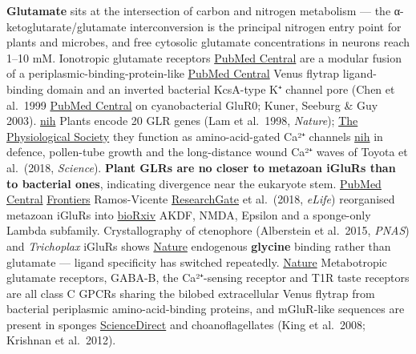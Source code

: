 \textbf{Glutamate} sits at the intersection of carbon and nitrogen metabolism --- the α-ketoglutarate/glutamate interconversion is the principal nitrogen entry point for plants and microbes, and free cytosolic glutamate concentrations in neurons reach 1--10 mM. Ionotropic glutamate receptors \href{https://pmc.ncbi.nlm.nih.gov/articles/PMC9233959/}{PubMed Central} are a modular fusion of a periplasmic-binding-protein-like \href{https://pmc.ncbi.nlm.nih.gov/articles/PMC9233959/}{PubMed Central} Venus flytrap ligand-binding domain and an inverted bacterial KcsA-type K⁺ channel pore (Chen et al.~1999 \href{https://pmc.ncbi.nlm.nih.gov/articles/PMC9233959/}{PubMed Central} on cyanobacterial GluR0; Kuner, Seeburg \& Guy 2003). \href{https://www.ncbi.nlm.nih.gov/pmc/articles/PMC2924276/}{nih} Plants encode 20 GLR genes (Lam et al.~1998, \emph{Nature}); \href{https://physoc.onlinelibrary.wiley.com/doi/10.1113/JP279026}{The Physiological Society} they function as amino-acid-gated Ca²⁺ channels \href{https://www.ncbi.nlm.nih.gov/pmc/articles/PMC2924276/}{nih} in defence, pollen-tube growth and the long-distance wound Ca²⁺ waves of Toyota et al.~(2018, \emph{Science}). \textbf{Plant GLRs are no closer to metazoan iGluRs than to bacterial ones}, indicating divergence near the eukaryote stem. \href{https://pmc.ncbi.nlm.nih.gov/articles/PMC3483616/}{PubMed Central} \href{https://www.frontiersin.org/articles/10.3389/fpls.2012.00235/full}{Frontiers} Ramos-Vicente \href{https://www.researchgate.net/scientific-contributions/David-Ramos-Vicente-2129164358}{ResearchGate} et al.~(2018, \emph{eLife}) reorganised metazoan iGluRs into \href{https://www.biorxiv.org/content/10.1101/2024.06.25.600656v1.full}{bioRxiv} AKDF, NMDA, Epsilon and a sponge-only Lambda subfamily. Crystallography of ctenophore (Alberstein et al.~2015, \emph{PNAS}) and \emph{Trichoplax} iGluRs shows \href{https://www.nature.com/articles/s42003-025-08402-3}{Nature} endogenous \textbf{glycine} binding rather than glutamate --- ligand specificity has switched repeatedly. \href{https://www.nature.com/articles/s42003-025-08402-3}{Nature} Metabotropic glutamate receptors, GABA-B, the Ca²⁺-sensing receptor and T1R taste receptors are all class C GPCRs sharing the bilobed extracellular Venus flytrap from bacterial periplasmic amino-acid-binding proteins, and mGluR-like sequences are present in sponges \href{https://www.sciencedirect.com/topics/biochemistry-genetics-and-molecular-biology/ionotropic-glutamate-receptor}{ScienceDirect} and choanoflagellates (King et al.~2008; Krishnan et al.~2012).

